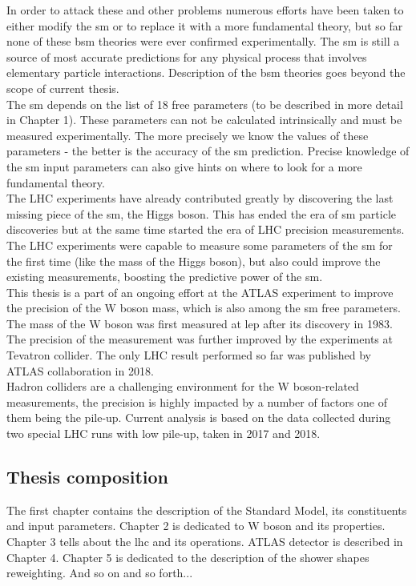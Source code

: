 In order to attack these and other problems numerous efforts have been taken to either modify the \gls{sm} or to replace it with a more fundamental theory, but so far none of these \gls{bsm} theories were ever confirmed experimentally. The \gls{sm} is still a source of most accurate predictions for any physical process that involves elementary particle interactions. Description of the \gls{bsm} theories goes beyond the scope of current thesis. \\
The \gls{sm} depends on the list of 18 free parameters (to be described in more detail in Chapter 1). These parameters can not be calculated intrinsically and must be measured experimentally. The more precisely we know the values of these parameters - the better is the accuracy of the \gls{sm} prediction. Precise knowledge of the \gls{sm} input parameters can also give hints on where to look for a more fundamental theory. \\
The LHC experiments have already contributed greatly by discovering the last missing piece of the \gls{sm}, the Higgs boson. This has ended the era of \gls{sm} particle discoveries but at the same time started the era of LHC precision measurements. The LHC experiments were capable to measure some parameters of the \gls{sm} for the first time (like the mass of the Higgs boson), but also could improve the existing measurements, boosting the predictive power of the \gls{sm}. \\
This thesis is a part of an ongoing effort at the ATLAS experiment to improve the precision of the W boson mass, which is also among the \gls{sm} free parameters. The mass of the W boson was first measured at \gls{lep} after its discovery in 1983. The precision of the measurement was further improved by the experiments at Tevatron collider. The only LHC result performed so far was published by ATLAS collaboration in 2018.\\
Hadron colliders are a challenging environment for the W boson-related measurements, the precision is highly impacted by a number of factors one of them being the pile-up. Current analysis is based on the data collected during two special LHC runs with low pile-up, taken in 2017 and 2018.  

\subsection{Thesis composition}
The first chapter contains the description of the Standard Model, its constituents and input parameters. Chapter 2 is dedicated to W boson and its properties. Chapter 3 tells about the \gls{lhc} and its operations. ATLAS detector is described in Chapter 4. Chapter 5 is dedicated to the description of the shower shapes reweighting. And so on and so forth...